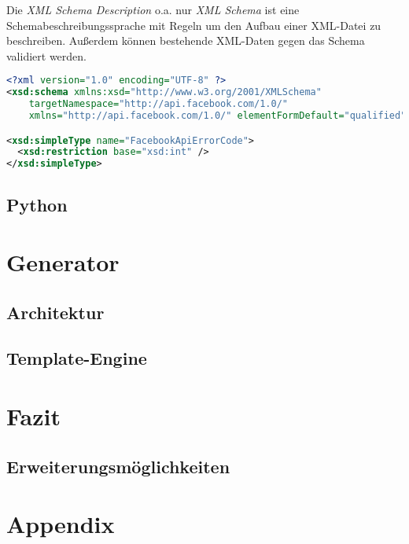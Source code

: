 \documentclass[a4paper]{scrartcl}
\begin{document}
    Die \emph{XML Schema Description} o.a. nur \emph{XML Schema} ist eine Schemabeschreibungssprache mit Regeln um den Aufbau einer XML-Datei zu beschreiben. Außerdem können bestehende XML-Daten gegen das Schema validiert werden.

    \begin{lstlisting}[language=XML, caption=Beispiel für einen einfachen Schematyp]
<?xml version="1.0" encoding="UTF-8" ?>
<xsd:schema xmlns:xsd="http://www.w3.org/2001/XMLSchema"
    targetNamespace="http://api.facebook.com/1.0/"
    xmlns="http://api.facebook.com/1.0/" elementFormDefault="qualified">

<xsd:simpleType name="FacebookApiErrorCode">
  <xsd:restriction base="xsd:int" />
</xsd:simpleType>
    \end{lstlisting}

    \subsection{Python}

    \section{Generator}

    \subsection{Architektur}

    \subsection{Template-Engine}

    \section{Fazit}

    \subsection{Erweiterungsmöglichkeiten}
    \label{sec:erweiterung}

    \clearpage
    \section{Appendix}

    
    \printglossary[type=main,title={Glossar},toctitle={Glossar}]

    \printbibliography
\end{document}
